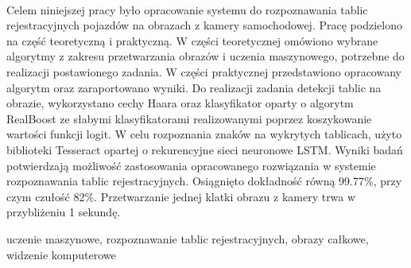 %


\begin{center}
    \\[1cm]
\end{center}
Celem niniejszej pracy było opracowanie systemu do rozpoznawania tablic rejestracyjnych pojazdów na obrazach z kamery samochodowej.
Pracę podzielono na część teoretyczną i praktyczną.
W części teoretycznej omówiono wybrane algorytmy z zakresu przetwarzania obrazów i uczenia maszynowego, potrzebne do realizacji postawionego zadania.
\linebreak W części praktycznej przedstawiono opracowany algorytm oraz zaraportowano wyniki.
Do realizacji zadania detekcji tablic na obrazie, wykorzystano cechy Haara oraz klasyfikator oparty o algorytm RealBoost ze słabymi klasyfikatorami realizowanymi poprzez koszykowanie wartości funkcji logit.
W celu rozpoznania znaków na wykrytych tablicach, użyto biblioteki Tesseract opartej o rekurencyjne sieci neuronowe LSTM\@.
Wyniki badań potwierdzają możliwość zastosowania opracowanego rozwiązania w systemie rozpoznawania tablic rejestracyjnych.
Osiągnięto dokładność równą 99.77\%, przy czym czułość 82\%.
Przetwarzanie jednej klatki obrazu z kamery trwa w przybliżeniu 1 sekundę.


\vspace{10pt}
 uczenie maszynowe, rozpoznawanie tablic rejestracyjnych, obrazy całkowe, widzenie komputerowe

\vfill

